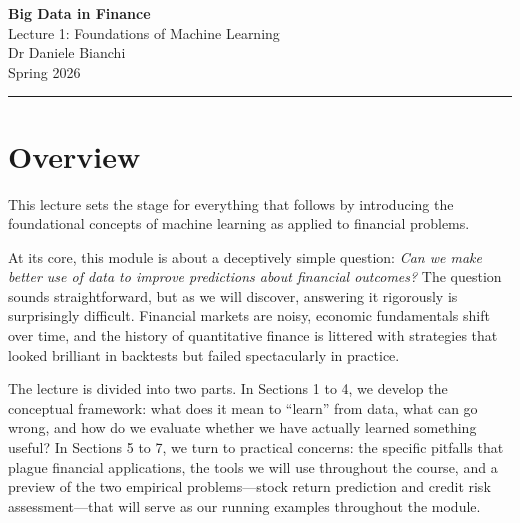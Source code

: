 \documentclass[11pt,a4paper]{article}
\begin{document}
\begin{center}
    {\LARGE\bfseries\textcolor{ThemeBlue}{Big Data in Finance}}\\[0.5em]
    {\Large Lecture 1: Foundations of Machine Learning}\\[1em]
    {\large Dr Daniele Bianchi}\\[0.5em]
    {\normalsize Spring 2026}
\end{center}

\vspace{1em}
\hrule
\vspace{1em}

\tableofcontents

\vspace{2cm}

\section*{Overview}

This lecture sets the stage for everything that follows by introducing the foundational concepts of machine learning as applied to financial problems. 

At its core, this module is about a deceptively simple question: \emph{Can we make better use of data to improve predictions about financial outcomes?} The question sounds straightforward, but as we will discover, answering it rigorously is surprisingly difficult. Financial markets are noisy, economic fundamentals shift over time, and the history of quantitative finance is littered with strategies that looked brilliant in backtests but failed spectacularly in practice.

The lecture is divided into two parts. In Sections 1 to 4, we develop the conceptual framework: what does it mean to ``learn'' from data, what can go wrong, and how do we evaluate whether we have actually learned something useful? In Sections 5 to 7, we turn to practical concerns: the specific pitfalls that plague financial applications, the tools we will use throughout the course, and a preview of the two empirical problems---stock return prediction and credit risk assessment---that will serve as our running examples throughout the module. 

\end{document}

